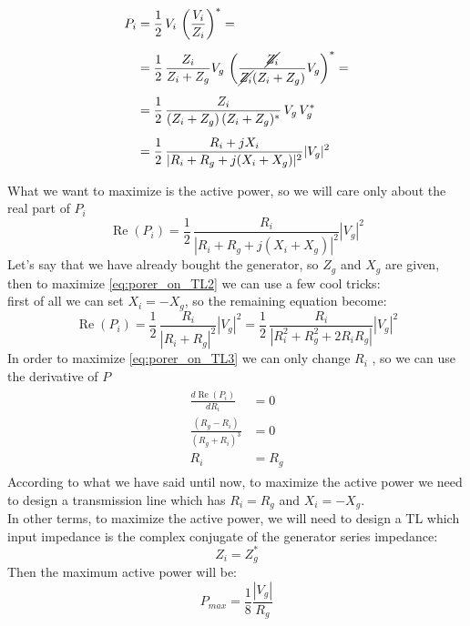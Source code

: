 \begin{align*}
    \begin{split}
        P_i&=\frac{1}{2}\,V_i\,\left(\frac{V_i}{Z_i}\right)^*=\\[5pt]
        &=\frac{1}{2}\,\frac{Z_i}{Z_i+Z_g}V_g\,\left(\frac{\cancel{Z_i}}{\cancel{Z_i}(Z_i+Z_g)}V_g\right)^*=\\[5pt]
        &=\frac{1}{2}\,\frac{Z_i}{(Z_i+Z_g)\,(Z_i+Z_g)^*}\,V_g\,V_g^*\\[5pt]
        &=\frac{1}{2}\,\frac{R_i+jX_i}{|R_i+R_g+j(X_i+X_g)|^2}|V_g|^2\\[5pt]
    \end{split}
\end{align*}
What we want to maximize is the active power, so we will care only about the real part of $P_i$
\begin{equation}
    \operatorname{Re}(P_i)=\frac{1}{2}\,\frac{R_i}{|R_i+R_g+j(X_i+X_g)|^2}|V_g|^2
\label{eq:porer_on_TL2}
\end{equation}
Let's say that we have already bought the generator, so $Z_g$ and $X_g$ are given, then to maximize \cref{eq:porer_on_TL2} we can use a few cool tricks:\\
first of all we can set $X_i=-X_g$, so the remaining equation become:
\begin{equation}
    \operatorname{Re}(P_i)=\frac{1}{2}\,\frac{R_i}{|R_i+R_g|^2}|V_g|^2=\frac{1}{2}\,\frac{R_i}{|R_i^2+R_g^2+2R_iR_g|}|V_g|^2
\label{eq:porer_on_TL3}
\end{equation}
In order to maximize \cref{eq:porer_on_TL3} we can only change $R_i$ , so we can use the derivative of $P$
\begin{align}
    \begin{split}
        \frac{d \operatorname{Re}(P_i)} {d R_i}&=0\\[5pt]
        \frac{(R_g - R_i)}{(R_g + R_i)^3}&=0\\[5pt]
        R_i&=R_g
    \end{split}
\end{align}
According to what we have said until now, to maximize the active power we need to design a transmission line which has $R_i=R_g$ and $X_i=-X_g$.\\
In other terms, to maximize the active power, we will need to design a TL which input impedance is the complex conjugate of the generator series impedance:
\begin{equation}
    Z_i=Z_g^*
\end{equation}
Then the maximum active power will be:
\begin{equation}
    P_{max}=\frac{1}{8}\frac{|V_g|}{R_g}
\end{equation}
